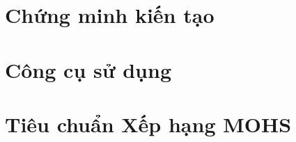 \documentclass[openany,twoside,a4paper]{book}
\begin{document}
\chapter{Chứng minh kiến tạo}


\appendix

\chapter{Công cụ sử dụng}


\chapter{Tiêu chuẩn Xếp hạng MOHS}


\clearpage

\printglossaries
\end{document}

